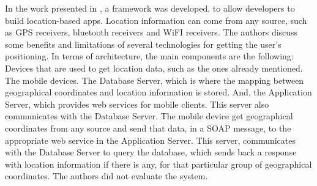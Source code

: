 In the work presented in \cite{Krevl2006}, a framework
was developed, to allow developers to build
location-based apps. Location information can come
from any source, such as GPS receivers, bluetooth
receivers and WiFI receivers.
The authors discuss some benefits and limitations
of several technologies for getting the
user's positioning.
In terms of architecture, the main components
are the following:
Devices that are used to get location data, such as
the ones already mentioned. The mobile devices.
The Database Server, which is where the mapping
between geographical coordinates and location
information is stored.
And, the Application Server, which provides web services for
mobile clients. This server also communicates
with the Database Server.
The mobile device get geographical coordinates
from any source and send that data, in a
SOAP \cite{Seely:2001:SCP:560836} message,
to the appropriate web service in the Application
Server. This server, communicates with the Database Server
to query the database, which sends back a response with
location information if there is any, for that
particular group of geographical coordinates.
The authors did not evaluate the system.

